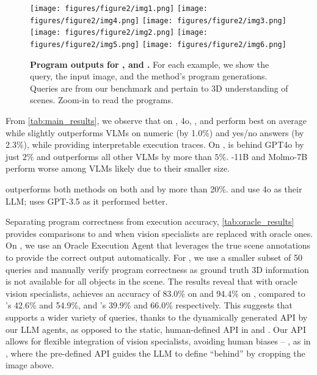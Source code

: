 \begin{figure*}[t!!]
    \centering
    \texttt{[image: figures/figure2/img1.png]}
    \texttt{[image: figures/figure2/img4.png]}
    \texttt{[image: figures/figure2/img3.png]}
    \texttt{[image: figures/figure2/img2.png]}
    \texttt{[image: figures/figure2/img5.png]}
    \texttt{[image: figures/figure2/img6.png]}
    \vspace{-3mm}
    \caption{\textbf{Program outputs for \visprog, \viper and \method.} For each example, we show the query, the input image, and the method's program generations. Queries are from our benchmark and pertain to 3D understanding of scenes. Zoom-in to read the programs.}
    \label{fig:main_results}
    \vspace{-5mm}
\end{figure*}

From \cref{tab:main_results}, we observe that
on \clevr, \gpt4o, \claude, and \gemini perform best on average while \method slightly outperforms VLMs on numeric (by 1.0\%) and yes/no answers (by 2.3\%), while providing interpretable execution traces.
On \ourbench, \method is behind GPT4o by just $2\%$ and outperforms all other VLMs by more than $5\%$. \llama-11B and Molmo-7B perform worse among VLMs likely due to their smaller size. 

\method outperforms both methods on both \clevr and \ourbench by more than 20\%. \visprog and \method use \gpt4o as their LLM; \viper uses GPT-3.5 as it performed better.

Separating program correctness from execution accuracy, \cref{tab:oracle_results} provides comparisons to \viper and \visprog when vision specialists are replaced with oracle ones. 
On \clevr, we use an Oracle Execution Agent that leverages the true scene annotations to provide the correct output automatically.
For \ourbench, we use a smaller subset of 50 queries and manually verify program correctness as ground truth 3D information is not available for all objects in the scene.
The results reveal that with oracle vision specialists, \method achieves an accuracy of 83.0\% on \clevr and 94.4\% on \ourbench, compared to \viper's 42.6\% and 54.9\%, and \visprog's 39.9\% and 66.0\% respectively.
This suggests that \method supports a wider variety of queries, thanks to the dynamically generated API by our LLM agents, as opposed to the static, human-defined API in \viper and \visprog. Our API allows for flexible integration of vision specialists, avoiding human biases -- \eg, as in \visprog, where the pre-defined API guides the LLM to define ``behind'' by cropping the image above.

